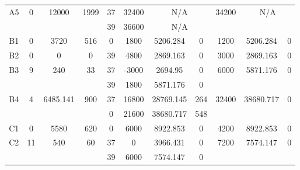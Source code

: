 \begin{sidewaystable}
\begin{tabular}{c||c|c|c||c|c|c|c||c|c|c}
         &
        
      \\
      \hline
      \multirow{2}{*}{A5} &
      \multirow{2}{*}{0} &
      \multirow{2}{*}{12000} &
      \multirow{2}{*}{1999} &
      37 &
      32400 &
        \multicolumn{2}{|c||}{N/A} &
      \multirow{2}{*}{34200} &
        \multicolumn{2}{c}{\multirow{2}{*}{N/A}}
      \\
      \cline{5-8}
       &
       &
       &
       &
      39 &
      36600 &
        \multicolumn{2}{|c||}{N/A} &
      
        
      \\
      \hline
      \multirow{1}{*}{B1} &
      \multirow{1}{*}{0} &
      \multirow{1}{*}{3720} &
      \multirow{1}{*}{516} &
      0 &
      1800 &
        5206.284 &
        0 &
      \multirow{1}{*}{1200} &
        \multirow{1}{*}{5206.284} &
        \multirow{1}{*}{0}
      \\
      \hline
      \multirow{1}{*}{B2} &
      \multirow{1}{*}{0} &
      \multirow{1}{*}{0} &
      \multirow{1}{*}{0} &
      39 &
      4800 &
        2869.163 &
        0 &
      \multirow{1}{*}{3000} &
        \multirow{1}{*}{2869.163} &
        \multirow{1}{*}{0}
      \\
      \hline
      \multirow{2}{*}{B3} &
      \multirow{2}{*}{9} &
      \multirow{2}{*}{240} &
      \multirow{2}{*}{33} &
      37 &
      -3000 &
        2694.95 &
        0 &
      \multirow{2}{*}{6000} &
        \multirow{2}{*}{5871.176} &
        \multirow{2}{*}{0}
      \\
      \cline{5-8}
       &
       &
       &
       &
      39 &
      1800 &
        5871.176 &
        0 &
      
         &
        
      \\
      \hline
      \multirow{2}{*}{B4} &
      \multirow{2}{*}{4} &
      \multirow{2}{*}{6485.141} &
      \multirow{2}{*}{900} &
      37 &
      16800 &
        28769.145 &
        264 &
      \multirow{2}{*}{32400} &
        \multirow{2}{*}{38680.717} &
        \multirow{2}{*}{0}
      \\
      \cline{5-8}
       &
       &
       &
       &
      0 &
      21600 &
        38680.717 &
        548 &
      
         &
        
      \\
      \hline
      \multirow{1}{*}{C1} &
      \multirow{1}{*}{0} &
      \multirow{1}{*}{5580} &
      \multirow{1}{*}{620} &
      0 &
      6000 &
        8922.853 &
        0 &
      \multirow{1}{*}{4200} &
        \multirow{1}{*}{8922.853} &
        \multirow{1}{*}{0}
      \\
      \hline
      \multirow{2}{*}{C2} &
      \multirow{2}{*}{11} &
      \multirow{2}{*}{540} &
      \multirow{2}{*}{60} &
      37 &
      0 &
        3966.431 &
        0 &
      \multirow{2}{*}{7200} &
        \multirow{2}{*}{7574.147} &
        \multirow{2}{*}{0}
      \\
      \cline{5-8}
       &
       &
       &
       &
      39 &
      6000 &
        7574.147 &
        0 &
      

\end{tabular}
\end{sidewaystable}

